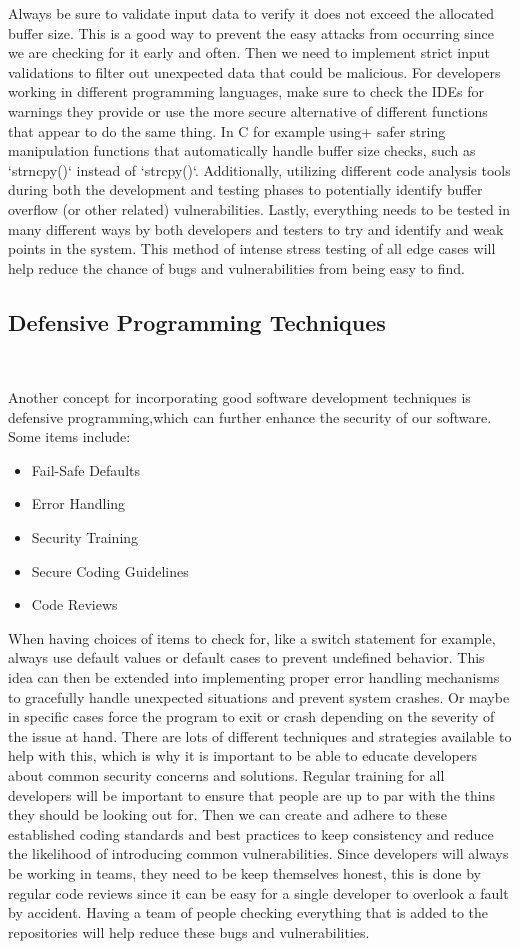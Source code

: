 \documentclass[12pt,a4paper]{report}
\begin{document}
Always be sure to validate input data to verify it does not exceed the allocated buffer size.
This is a good way to prevent the easy attacks from occurring since we are checking for it early and often.
Then we need to implement strict input validations to filter out unexpected data that could be malicious.
For developers working in different programming languages, make sure to check the IDEs for warnings they provide or use the more secure alternative of different functions that appear to do the same thing.
In C for example using+ safer string manipulation functions that automatically handle buffer size checks, such as `strncpy()` instead of `strcpy()`.
Additionally, utilizing different code analysis tools during both the development and testing phases to potentially identify buffer overflow (or other related) vulnerabilities.
Lastly, everything needs to be tested in many different ways by both developers and testers to try and identify and weak points in the system.
This method of intense stress testing of all edge cases will help reduce the chance of bugs and vulnerabilities from being easy to find.

\subsection{Defensive Programming Techniques}
\

Another concept for incorporating good software development techniques is defensive programming,which can further enhance the security of our software. Some items include:

\begin{itemize}
 \item Fail-Safe Defaults
 \item Error Handling
 \item Security Training
 \item Secure Coding Guidelines
 \item Code Reviews
\end{itemize}

When having choices of items to check for, like a switch statement for example, always  use default values or default cases to prevent undefined behavior.
This idea can then be extended into implementing proper error handling mechanisms to gracefully handle unexpected situations and prevent system crashes.
Or maybe in specific cases force the program to exit or crash depending on the severity of the issue at hand.
There are lots of different techniques and strategies available to help with this, which is why it is important to be able to educate developers about common security concerns and solutions.
Regular training for all developers will be important to ensure that people are up to par with the thins they should be looking out for.
Then we can create and adhere to these established coding standards and best practices to keep consistency and reduce the likelihood of introducing common vulnerabilities.
Since developers will always be working in teams, they need to be keep themselves honest, this is done by regular code reviews since it can be easy for a single developer to overlook a fault by accident.
Having a team of people checking everything that is added to the repositories will help reduce these bugs and vulnerabilities.
\end{document}
